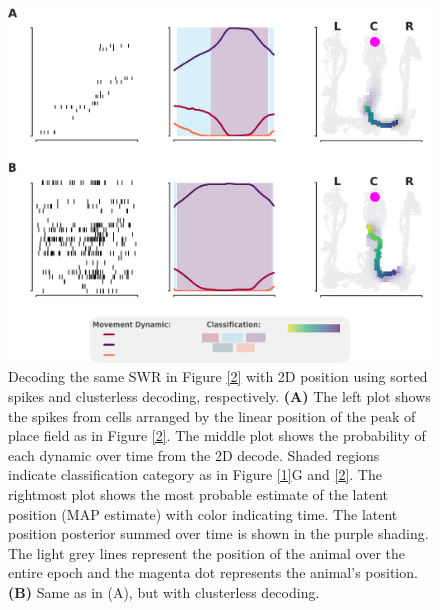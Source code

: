 \documentclass[times, twoside]{zHenriquesLab-StyleBioRxiv}
\begin{document}
\begin{figure}%
\centering
\includegraphics[width=0.80\linewidth]{figures/Figure2-supplemental1/Figure2_v3-supplemental1}
\caption{Decoding the same SWR in Figure \ref{2} with 2D position using sorted spikes and clusterless decoding, respectively. \textbf{(A)} The left plot shows the spikes from cells arranged by the linear position of the peak of place field as in Figure \ref{2}. The middle plot shows the probability of each dynamic over time from the 2D decode. Shaded regions indicate classification category as in Figure \ref{1}G and \ref{2}. The rightmost plot shows the most probable estimate of the latent position (MAP estimate) with color indicating time. The latent position posterior summed over time is shown in the purple shading. The light grey lines represent the position of the animal over the entire epoch and the magenta dot represents the animal's position. \textbf{(B)} Same as in (A), but with clusterless decoding.}
\label{fig:Figure2-Figure supplement 1}
\end{figure}
\end{document}

